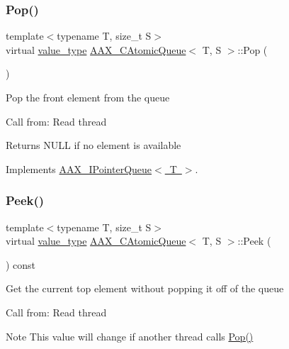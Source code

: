 \subsubsection{\texorpdfstring{Pop()}{Pop()}}
{\footnotesize\ttfamily template$<$typename T, size\+\_\+t S$>$ \\
virtual \mbox{\hyperlink{a01441_acbb95bad3be34c7e4c770bc8c455c252}{value\+\_\+type}} \mbox{\hyperlink{a01441}{A\+A\+X\+\_\+\+C\+Atomic\+Queue}}$<$ T, S $>$\+::Pop (\begin{DoxyParamCaption}{ }\end{DoxyParamCaption})\hspace{0.3cm}{\ttfamily [virtual]}}





Pop the front element from the queue

Call from\+: Read thread

\begin{DoxyReturn}{Returns}
{\ttfamily N\+U\+LL} if no element is available 
\end{DoxyReturn}


Implements \mbox{\hyperlink{a01861_a49990f21819f0f4493183ea0770d4125}{A\+A\+X\+\_\+\+I\+Pointer\+Queue$<$ T $>$}}.

\mbox{\label{a01441_a0b732544b0bcdd59acfca7fac5dca984}} 
\subsubsection{\texorpdfstring{Peek()}{Peek()}}
{\footnotesize\ttfamily template$<$typename T, size\+\_\+t S$>$ \\
virtual \mbox{\hyperlink{a01441_acbb95bad3be34c7e4c770bc8c455c252}{value\+\_\+type}} \mbox{\hyperlink{a01441}{A\+A\+X\+\_\+\+C\+Atomic\+Queue}}$<$ T, S $>$\+::Peek (\begin{DoxyParamCaption}{ }\end{DoxyParamCaption}) const\hspace{0.3cm}{\ttfamily [virtual]}}





Get the current top element without popping it off of the queue

Call from\+: Read thread

\begin{DoxyNote}{Note}
This value will change if another thread calls \mbox{\hyperlink{a01441_a0c64180813c16b4952761f82e32d7edd}{Pop()}} 
\end{DoxyNote}


